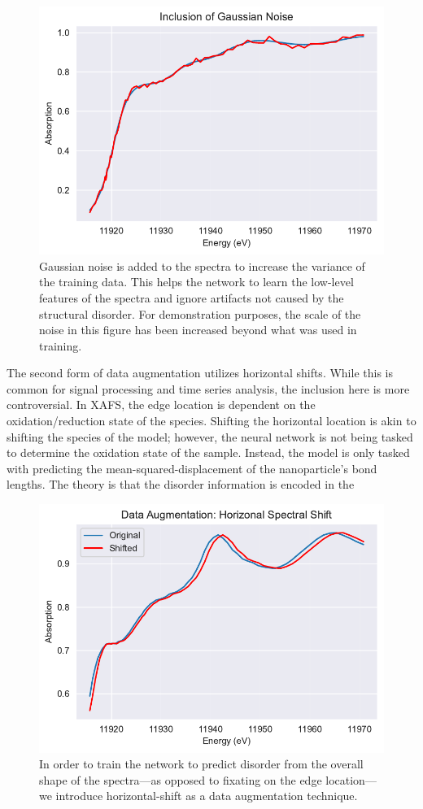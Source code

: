 \begin{figure}[h!]
    \centering
    \includegraphics[width=.75\linewidth]{Chapters/Figures/gaussian-noise-data-aug.pdf}
    \caption[Data Augmentation: Gaussian Noise]{Gaussian noise is added to the spectra to increase the variance of the training data. This helps the network to learn the low-level features of the spectra and ignore artifacts not caused by the structural disorder. For demonstration purposes, the scale of the noise in this figure has been increased beyond what was used in training.}
    \label{fig:data-aug-gauss-noise}
\end{figure}

The second form of data augmentation utilizes horizontal shifts. While this is common for signal processing and time series analysis, the inclusion here is more controversial. In XAFS, the edge location is dependent on the oxidation/reduction state of the species. Shifting the horizontal location is akin to shifting the species of the model; however, the neural network is not being tasked to determine the oxidation state of the sample. Instead, the model is only tasked with predicting the mean-squared-displacement of the nanoparticle's bond lengths. The theory is that the disorder information is encoded in the  

\begin{figure}[h!]
    \centering
    \includegraphics[width=.75\linewidth]{Chapters/Figures/data-aug-shift-pt75wieght.pdf}
    \caption[Data Augmentation: Horizontal Shift]{In order to train the network to predict disorder from the overall shape of the spectra---as opposed to fixating on the edge location---we introduce horizontal-shift as a data augmentation technique.}
    \label{fig:data-aug-hor}
\end{figure}

